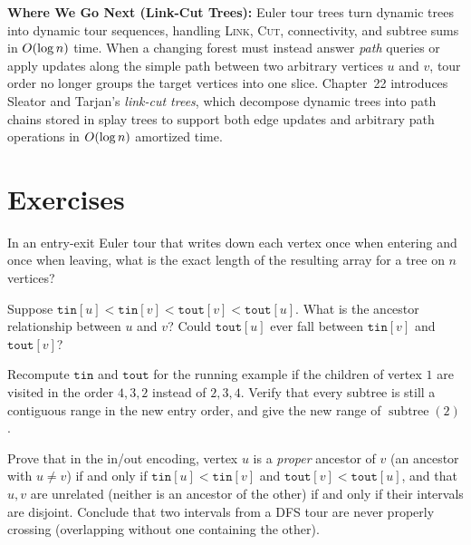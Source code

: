 \begin{connectionbox}
\textbf{Where We Go Next (Link-Cut Trees):} Euler tour trees turn dynamic trees into dynamic tour sequences, handling \textsc{Link}, \textsc{Cut}, connectivity, and subtree sums in $O(\log n)$ time. When a changing forest must instead answer \emph{path} queries or apply updates along the simple path between two arbitrary vertices $u$ and $v$, tour order no longer groups the target vertices into one slice. Chapter~22 introduces Sleator and Tarjan's \emph{link-cut trees}, which decompose dynamic trees into path chains stored in splay trees to support both edge updates and arbitrary path operations in $O(\log n)$ amortized time.
\end{connectionbox}

\section*{Exercises}

\begin{exercise}
In an entry-exit Euler tour that writes down each vertex once when entering and once when leaving, what is the exact length of the resulting array for a tree on $n$ vertices?
\end{exercise}

\begin{exercise}
Suppose $\texttt{tin}[u] < \texttt{tin}[v] < \texttt{tout}[v] < \texttt{tout}[u]$. What is the ancestor relationship between $u$ and $v$? Could $\texttt{tout}[u]$ ever fall between $\texttt{tin}[v]$ and $\texttt{tout}[v]$?
\end{exercise}

\begin{exercise}
Recompute $\texttt{tin}$ and $\texttt{tout}$ for the running example if the children
of vertex $1$ are visited in the order $4,3,2$ instead of $2,3,4$. Verify that every
subtree is still a contiguous range in the new entry order, and give the new range of
$\operatorname{subtree}(2)$.
\end{exercise}

\begin{exercise}
Prove that in the in/out encoding, vertex $u$ is a \emph{proper} ancestor of $v$ (an ancestor with $u\neq v$) if and only if
$\texttt{tin}[u]<\texttt{tin}[v]$ and $\texttt{tout}[v]<\texttt{tout}[u]$, and that $u,v$
are unrelated (neither is an ancestor of the other) if and only if their intervals are disjoint.
Conclude that two intervals from a DFS tour are never properly crossing (overlapping without one containing the other).
\end{exercise}

